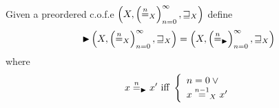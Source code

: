 \begin{definition}
  \label{def:later-p-cofe}
  Given a preordered c.o.f.e $\left(X, \left(\nequal_X\right)_{n=0}^{\infty}, \future_X \right)$ define
  \[
    \blater\left(X, \left(\nequal_X\right)_{n=0}^{\infty}, \future_X \right) = \left(X, \left(\nequal[n]_{\blater}\right)_{n=0}^{\infty}, \future_X \right)
  \]
  where
  \[
    x \nequal[n]_{\blater} x' \text{ iff } \left\{
      \begin{array}{l}
        n = 0 \vee{} \\
        x \nequal
        [n-1]_X x'
      \end{array}
    \right.
  \]
\end{definition}


